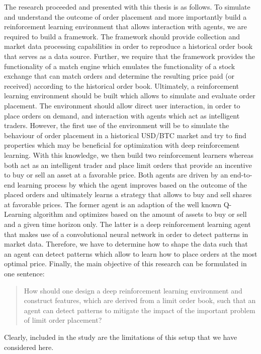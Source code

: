 The research proceeded and presented with this thesis is as follows.
To simulate and understand the outcome of order placement and more importantly build a reinforcement learning environment that allows interaction with agents, we are required to build a framework.
The framework should provide collection and market data processing capabilities in order to reproduce a historical order book that serves as a data source.
Further, we require that the framework provides the functionality of a match engine which emulates the functionality of a stock exchange that can match orders and determine the resulting price paid (or received) according to the historical order book.
Ultimately, a reinforcement learning environment should be built which allows to simulate and evaluate order placement.
The environment should allow direct user interaction, in order to place orders on demand, and interaction with agents which act as intelligent traders.
However, the first use of the environment will be to simulate the behaviour of order placement in a historical USD/BTC market and try to find properties which may be beneficial for optimization with deep reinforcement learning.
With this knowledge, we then build two reinforcement learners whereas both act as an intelligent trader and place limit orders that provide an incentive to buy or sell an asset at a favorable price.
Both agents are driven by an end-to-end learning process by which the agent improves based on the outcome of the placed orders and ultimately learns a strategy that allows to buy and sell shares at favorable prices.
The former agent is an adaption of the well known Q-Learning algorithm and optimizes based on the amount of assets to buy or sell and a given time horizon only.
The latter is a deep reinforcement learning agent that makes use of a convolutional neural network in order to detect patterns in market data.
Therefore, we have to determine how to shape the data such that an agent can detect patterns which allow to learn how to place orders at the most optimal price.
Finally, the main objective of this research can be formulated in one sentence:
\begin{quote}
    How should one design a deep reinforcement learning environment and construct features, which are derived from a limit order book, such that an agent can detect patterns to mitigate the impact of the important problem of limit order placement?
\end{quote}
Clearly, included in the study are the limitations of this setup that we have considered here.

